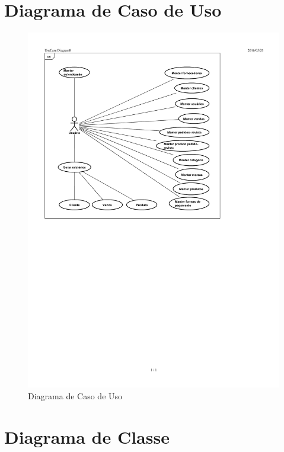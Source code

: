 \documentclass[chapter=TITLE,12pt,oneside,a4paper,english,french,sumario=tradicional,spanish,brazil,]{abntex2}
\begin{document}
\section{Diagrama de Caso de Uso}
\begin{figure}[!htpb]\centering
	\includegraphics[scale=1.2]{uc.pdf}\caption{Diagrama de Caso de Uso}
\end{figure}


\section{Diagrama de Classe}
\end{document}
